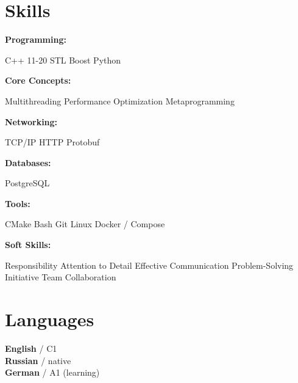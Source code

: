 \documentclass[]{deedy-resume}
\begin{document}
\begin{minipage}[t]{0.25\textwidth}


\section{Skills}

\textbf{Programming:}
\begin{skillitemize}
    \skillitem C++ 11-20
    \skillitem STL
    \skillitem Boost
    \skillitem Python
\end{skillitemize}
\halfspace

\textbf{Core Concepts:}
\begin{skillitemize}
    \skillitem Multithreading
    \skillitem Performance Optimization
    \skillitem Metaprogramming
\end{skillitemize}
\halfspace

\textbf{Networking:}
\begin{skillitemize}
    \skillitem TCP/IP
    \skillitem HTTP
    \skillitem Protobuf
\end{skillitemize}
\halfspace

\textbf{Databases:}
\begin{skillitemize}
    \skillitem PostgreSQL
\end{skillitemize}
\halfspace

\textbf{Tools:}
\begin{skillitemize}
    \skillitem CMake
    \skillitem Bash
    \skillitem Git
    \skillitem Linux
    \skillitem Docker / Compose
\end{skillitemize}
\halfspace

\textbf{Soft Skills:}
\begin{skillitemize}
    \skillitem Responsibility
    \skillitem Attention to Detail
    \skillitem Effective Communication
    \skillitem Problem-Solving
    \skillitem Initiative
    \skillitem Team Collaboration
\end{skillitemize}

\sectionspace


\section{Languages}
\textbf{English} / C1 \\
\textbf{Russian} / native \\
\textbf{German} / A1 (learning)


\end{minipage}
\end{document}
